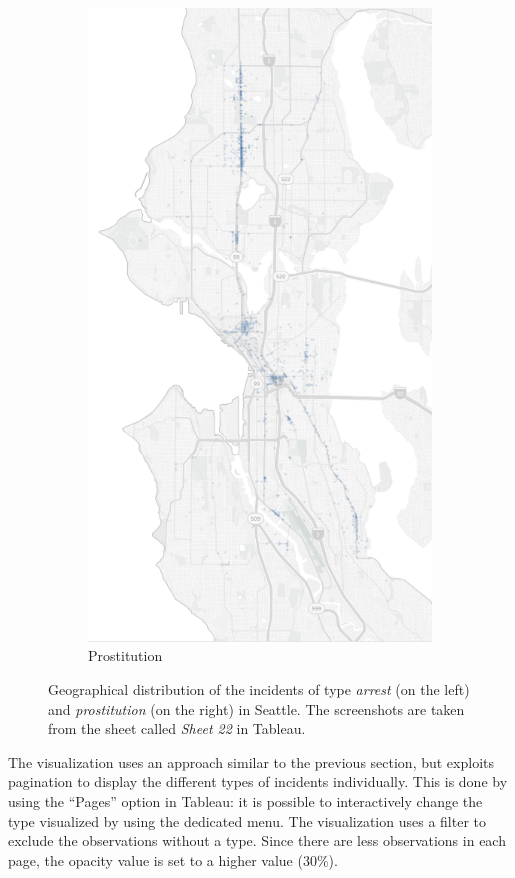 \begin{figure}[h!]
\begin{subfigure}{0.5\textwidth}
        \includegraphics[width=0.8\linewidth]{figures/1_2_geographical_distribution_prostitution}
        \caption{Prostitution}
        \label{fig:1_2_prostitution}
    \end{subfigure}
    \caption{Geographical distribution of the incidents of type \textit{arrest} (on the left) and \textit{prostitution} (on the right) in Seattle. The screenshots are taken from the sheet called \textit{Sheet 22} in Tableau.}
    \label{fig:1_2_geographical_distribution_by_type}
\end{figure}

The visualization uses an approach similar to the previous section, but exploits pagination to display the different types of incidents individually.
This is done by using the ``Pages'' option in Tableau:
it is possible to interactively change the type visualized by using the dedicated menu.
The visualization uses a filter to exclude the observations without a type.
Since there are less observations in each page, the opacity value is set to a higher value ($30\%$).

